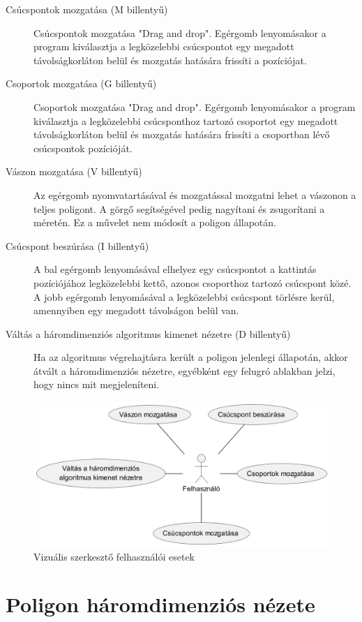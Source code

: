 \begin{description}
    \item[Csúcspontok mozgatása (M billentyű)] Csúcspontok mozgatása "Drag and drop". Egérgomb lenyomásakor a program kiválasztja a legközelebbi csúcspontot egy megadott távolságkorláton belül és mozgatás hatására frissíti a pozíciójat.
    \item[Csoportok mozgatása (G billentyű)]  Csoportok mozgatása "Drag and drop". Egérgomb lenyomásakor a program kiválasztja a legközelebbi csúcsponthoz tartozó csoportot egy megadott távolságkorláton belül és mozgatás hatására frissíti a csoportban lévő csúcspontok pozícióját.
    \item[Vászon mozgatása (V billentyű)] Az egérgomb nyomvatartásával és mozgatással mozgatni lehet a vászonon a teljes poligont. A görgő segítségével pedig nagyítani és zsugorítani a méretén. Ez a művelet nem módosít a poligon állapotán.
    \item[Csúcspont beszúrása (I billentyű)] A bal egérgomb lenyomásával elhelyez egy csúcspontot a kattintás pozíciójához legközelebbi kettő, azonos csoporthoz tartozó csúcspont közé. A jobb egérgomb lenyomásával a legközelebbi csúcspont törlésre kerül, amennyiben egy megadott távolságon belül van.
    \item[Váltás a háromdimenziós algoritmus kimenet nézetre (D billentyű)] Ha az algoritmus végrehajtásra került a poligon jelenlegi állapotán, akkor átvált a háromdimenziós nézetre, egyébként egy felugró ablakban jelzi, hogy nincs mit megjeleníteni.
\end{description}

\begin{figure}[H]
    \centering
    \includegraphics[width=.7\linewidth]{images/usecase_visual_editor.png}
    \caption{Vizuális szerkesztő felhasználói esetek}
    \label{fig:usecase_visual_editor-1}
\end{figure}

\section{Poligon háromdimenziós nézete}

